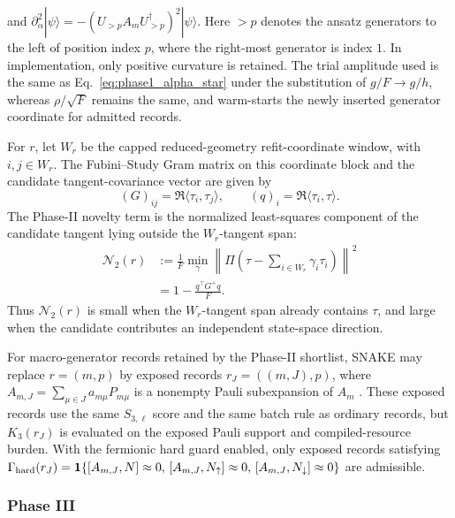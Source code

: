 \documentclass[
  reprint,
  amsmath,
  amssymb,
  aps,
  pra,
  nofootinbib,
  superscriptaddress,
  floatfix
]{revtex4-2}
\newcommand{\ket}[1]{|#1\rangle}
\begin{document}
and $\partial^2_{\alpha}\ket{\psi} =-(U_{>p}A_mU_{>p}^{\dagger})^2\ket{\psi}.$ Here \(>p\) denotes the ansatz generators to the left of position index \(p\), where the right-most generator is index \(1\). In implementation, only positive curvature is retained. The trial amplitude used is the same as Eq.~\ref{eq:phase1_alpha_star} under the substitution of $g/F \to g / h$, whereas $\rho/\sqrt{F}$ remains the same, and warm-starts the newly inserted generator coordinate for admitted records.

For \(r\), let \(W_r\) be the capped reduced-geometry refit-coordinate window, with \(i,j\in W_r\). The Fubini--Study Gram matrix on this coordinate block and the candidate tangent-covariance vector are given by
\begin{equation*}
(G)_{ij}=\Re\langle\tau_i,\tau_j\rangle,
\qquad
(q)_i=\Re\langle\tau_i,\tau\rangle.
\end{equation*}
The Phase-II novelty term is the normalized least-squares component of the candidate tangent lying outside the \(W_r\)-tangent span:
\begin{equation}
\begin{aligned}
\mathcal N_2(r)
&:=
\frac{1}{F}
\min_{\gamma}
\left\|
\Pi\left(\tau-\sum_{i\in W_r}\gamma_i\tau_i\right)
\right\|^2 \\
&=
1-
\frac{q^{\top}G^+q}{F}.
\end{aligned}
\label{eq:phase2_novelty}
\end{equation}
Thus $\mathcal N_2(r)$ is small when the \(W_r\)-tangent span already contains $\tau$, and large when the candidate contributes an independent state-space direction.

For macro-generator records retained by the Phase-II shortlist, SNAKE may replace \(r=(m,p)\) by exposed records \(r_J=((m,J),p)\), where \(A_{m,J}=\sum_{\mu\in J}a_{m\mu}P_{m\mu}\) is a nonempty Pauli subexpansion of \(A_m\) \cite{Tang2021}. These exposed records use the same \(S_{3,\ell}\) score and the same batch rule as ordinary records, but \(K_3(r_J)\) is evaluated on the exposed Pauli support and compiled-resource burden. With the fermionic hard guard enabled, only exposed records satisfying \(\Gamma_{\rm hard}(r_J)=\mathbf 1\{[A_{m,J},N]\approx0,\,[A_{m,J},N_\uparrow]\approx0,\,[A_{m,J},N_\downarrow]\approx0\}\) are admissible.

\subsubsection{Phase III}
\end{document}
